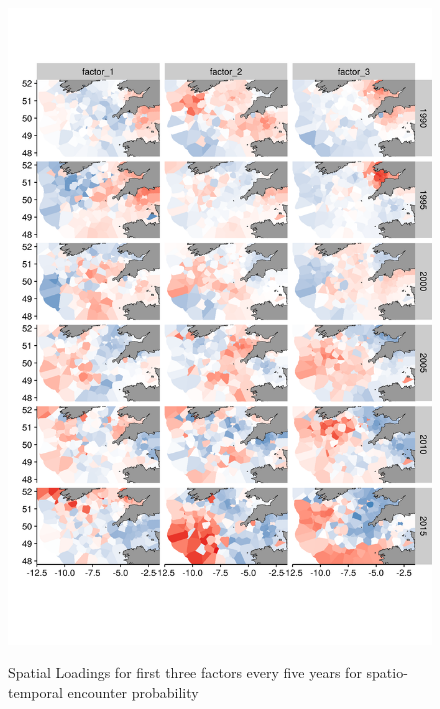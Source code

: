 \documentclass{article}
\begin{document}
\begin{figure}
\begin{center}
	\includegraphics[width = 0.8\linewidth]{"figures/Suppl - SpatioTempLoadingsEpsilon1"}
	\label{fig:S5}
	\caption{Spatial Loadings for first three factors every five years for
	spatio-temporal encounter probability}
	\end{center}
\end{figure}
\end{document}
